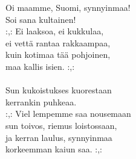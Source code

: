 
Oi maamme, Suomi, synnyinmaa! \\ Soi sana kultainen! \\ :,: Ei laaksoa, ei kukkulaa, \\ ei vettä rantaa rakkaampaa, \\ kuin kotimaa tää pohjoinen, \\ maa kallis isien. :,: \\ \hspace{10mm} \\ Sun kukoistukses kuorestaan \\ kerrankin puhkeaa. \\ :,: Viel lempemme saa nousemaan \\ sun toivos, riemus loistossaan, \\ ja kerran laulus, synnyinmaa \\ korkeemman kaiun saa. :,: